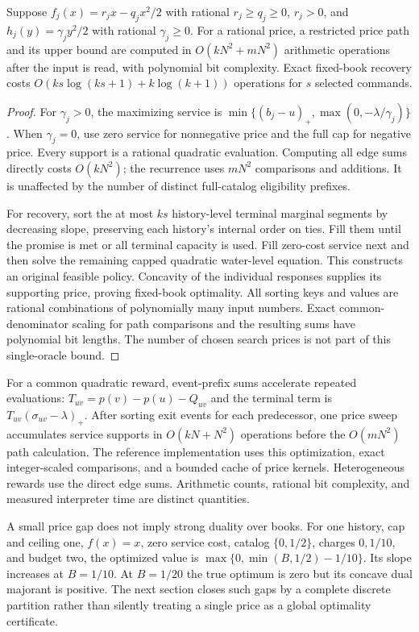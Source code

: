 \begin{proposition}\label{prop:oracle54}
Suppose $f_j(x)=r_jx-q_jx^2/2$ with rational $r_j\geq q_j\geq0$, $r_j>0$, and $h_j(y)=\gamma_jy^2/2$ with rational $\gamma_j\geq0$. For a rational price, a restricted price path and its upper bound are computed in $O(kN^2+mN^2)$ arithmetic operations after the input is read, with polynomial bit complexity. Exact fixed-book recovery costs $O(ks\log(ks+1)+k\log(k+1))$ operations for $s$ selected commands.
\end{proposition}
\begin{proof}
For $\gamma_j>0$, the maximizing service is $\min\{(b_j-u)_+,\max(0,-\lambda/\gamma_j)\}$. When $\gamma_j=0$, use zero service for nonnegative price and the full cap for negative price. Every support is a rational quadratic evaluation. Computing all edge sums directly costs $O(kN^2)$; the recurrence uses $mN^2$ comparisons and additions. It is unaffected by the number of distinct full-catalog eligibility prefixes.

For recovery, sort the at most $ks$ history-level terminal marginal segments by decreasing slope, preserving each history's internal order on ties. Fill them until the promise is met or all terminal capacity is used. Fill zero-cost service next and then solve the remaining capped quadratic water-level equation. This constructs an original feasible policy. Concavity of the individual responses supplies its supporting price, proving fixed-book optimality. All sorting keys and values are rational combinations of polynomially many input numbers. Exact common-denominator scaling for path comparisons and the resulting sums have polynomial bit lengths. The number of chosen search prices is not part of this single-oracle bound.
\end{proof}

For a common quadratic reward, event-prefix sums accelerate repeated evaluations: $T_{uv}=p(v)-p(u)-Q_{uv}$ and the terminal term is $T_{uv}(\sigma_{uv}-\lambda)_+$. After sorting exit events for each predecessor, one price sweep accumulates service supports in $O(kN+N^2)$ operations before the $O(mN^2)$ path calculation. The reference implementation uses this optimization, exact integer-scaled comparisons, and a bounded cache of price kernels. Heterogeneous rewards use the direct edge sums. Arithmetic counts, rational bit complexity, and measured interpreter time are distinct quantities.

A small price gap does not imply strong duality over books. For one history, cap and ceiling one, $f(x)=x$, zero service cost, catalog $\{0,1/2\}$, charges $0,1/10$, and budget two, the optimized value is $\max\{0,\min(B,1/2)-1/10\}$. Its slope increases at $B=1/10$. At $B=1/20$ the true optimum is zero but its concave dual majorant is positive. The next section closes such gaps by a complete discrete partition rather than silently treating a single price as a global optimality certificate.
